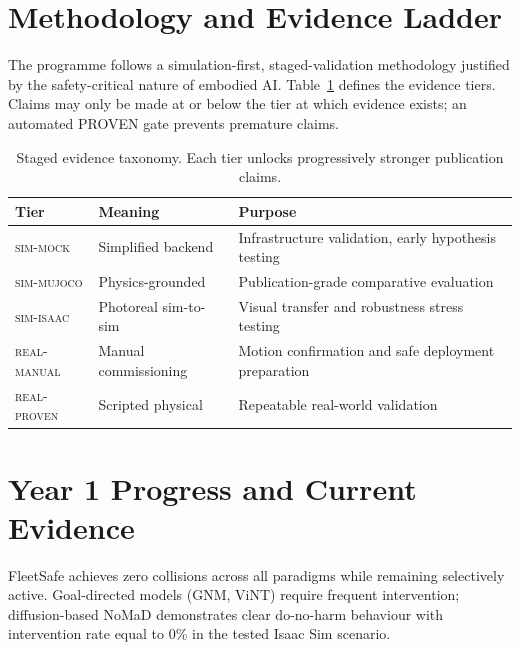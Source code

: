 \documentclass[12pt,a4paper]{article}
\begin{document}
\section{Methodology and Evidence Ladder}
\label{sec:methodology}

The programme follows a simulation-first, staged-validation methodology
justified by the safety-critical nature of embodied AI. Table~\ref{tab:tiers}
defines the evidence tiers. Claims may only be made at or below the tier at
which evidence exists; an automated PROVEN gate prevents premature claims.

\begin{table}[t]
\centering
\caption{Staged evidence taxonomy. Each tier unlocks progressively stronger
         publication claims.}
\label{tab:tiers}
\begin{tabular}{@{}lll@{}}
\toprule
Tier & Meaning & Purpose \\
\midrule
\textsc{sim-mock}    & Simplified backend    & Infrastructure validation, early
                                               hypothesis testing \\
\textsc{sim-mujoco}  & Physics-grounded      & Publication-grade comparative
                                               evaluation \\
\textsc{sim-isaac}   & Photoreal sim-to-sim  & Visual transfer and robustness
                                               stress testing \\
\textsc{real-manual} & Manual commissioning  & Motion confirmation and safe
                                               deployment preparation \\
\textsc{real-proven} & Scripted physical     & Repeatable real-world validation \\
\bottomrule
\end{tabular}
\end{table}

\section{Year 1 Progress and Current Evidence}
\label{sec:results}

FleetSafe achieves zero collisions across all paradigms while remaining
selectively active. Goal-directed models (GNM, ViNT) require frequent
intervention; diffusion-based NoMaD demonstrates clear do-no-harm behaviour
with intervention rate equal to 0\% in the tested Isaac Sim scenario.
\end{document}
